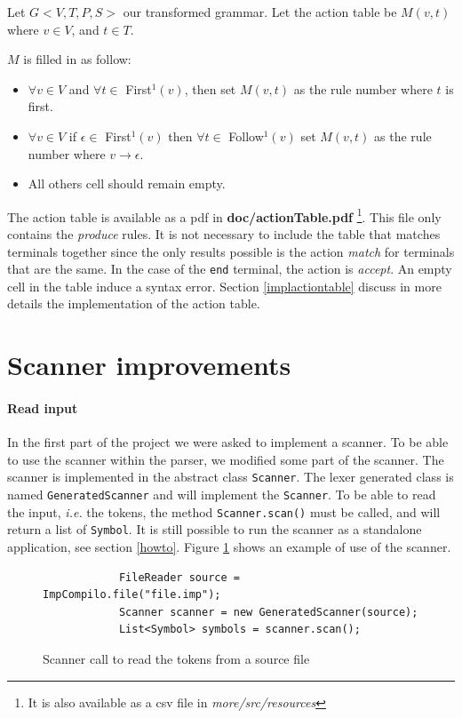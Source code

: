 \documentclass[letterpaper]{article}
\begin{document}
Let $G<V, T, P, S>$ our transformed grammar.
Let the action table be $M(v, t)$ where
$v \in V$, and $t \in T$.

$M$ is filled in as follow:
\begin{itemize}
    \item $\forall v \in V$ and $\forall t \in$ First$^1(v)$,
    then set $M(v, t)$ as the rule number where $t$ is first.
    \item $\forall v \in V$ if $\epsilon \in $ First$^1(v)$ then
    $\forall t \in$ Follow$^1(v)$ set $M(v, t)$ as the rule number
    where $v \rightarrow \epsilon$.
    \item All others cell should remain empty.
\end{itemize}

The action table is available as a pdf in
\textbf{doc/actionTable.pdf}
\footnote{It is also available as a csv file in \textit{more/src/resources}}.
This file only contains the
\textit{produce} rules.
It is not necessary to include the table that matches terminals together
since the only results possible is the action \textit{match}
for terminals that are the same.
In the case of the \texttt{end} terminal, the action is \textit{accept}.
An empty cell in the table induce a syntax error.
Section \ref{implactiontable} discuss in more details the implementation
of the action table.

\section{Scanner improvements}

\label{scanimprovements}
\paragraph{Read input}
In the first part of the project we were asked to implement a scanner.
To be able to use the scanner within the parser, we modified some part of the
scanner. The scanner is implemented in the abstract class \texttt{Scanner}.
The lexer generated class is named \texttt{GeneratedScanner} and will
implement the \texttt{Scanner}. To be able to read the input, \textit{i.e.}
the tokens, the method \texttt{Scanner.scan()} must be called, and
will return a list of \texttt{Symbol}. It is still possible to run the scanner
as a standalone application, see section \ref{howto}.
Figure \ref{fig:scannercall} shows an example of use of the scanner.

\begin{figure}[H]
    \begin{lstlisting}
            FileReader source = ImpCompilo.file("file.imp");
            Scanner scanner = new GeneratedScanner(source);
            List<Symbol> symbols = scanner.scan();
    \end{lstlisting}
    \caption{Scanner call to read the tokens from a source file}
    \label{fig:scannercall}
\end{figure}
\end{document}
